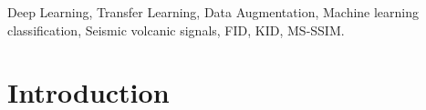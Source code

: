 \documentclass[journal]{IEEEtran}
\begin{document}
\begin{IEEEkeywords}
Deep Learning, Transfer Learning, Data Augmentation, Machine learning classification, Seismic volcanic signals, FID, KID, MS-SSIM.
\end{IEEEkeywords}






%
\IEEEpeerreviewmaketitle



\section{Introduction} \label{introduction}
%
%
%
%
\end{document}
